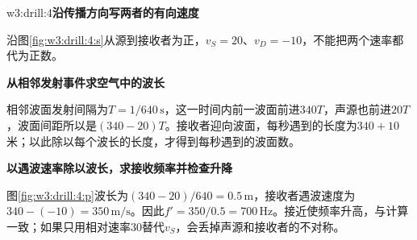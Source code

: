 \begin{drillsolution}{w3:drill:4}\textbf{沿传播方向写两者的有向速度}\par\nobreak
沿图\ref{fig:w3:drill:4:s}从源到接收者为正，$v_S=20$、$v_D=-10$，不能把两个速率都代为正数。


\par\medskip{}\noindent\textbf{从相邻发射事件求空气中的波长}\par\nobreak
相邻波面发射间隔为$T=1/640\,\mathrm s$，这一时间内前一波面前进$340T$，声源也前进$20T$，波面间距所以是$(340-20)T$。接收者迎向波面，每秒遇到的长度为$340+10$米；以此除以每个波长的长度，才得到每秒遇到的波面数。



\par\medskip{}\noindent\textbf{以遇波速率除以波长，求接收频率并检查升降}\par\nobreak
图\ref{fig:w3:drill:4:p}波长为$(340-20)/640=0.5\,\mathrm m$，接收者遇波速度为$340-(-10)=350\,\mathrm{m/s}$。因此$f'=350/0.5=700\,\mathrm{Hz}$。接近使频率升高，与计算一致；如果只用相对速率$30$替代$v_S$，会丢掉声源和接收者的不对称。\end{drillsolution}
